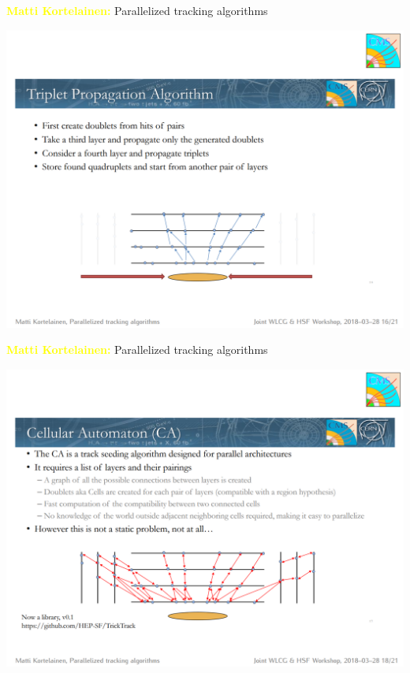 \documentclass[aspectratio=169]{beamer}
\begin{document}
\begin{frame}{\textcolor{yellow}{\bf Matti Kortelainen:} Parallelized tracking algorithms}
\vspace{0.13 cm}
\begin{center}
\includegraphics[width=0.73\linewidth]{tracking-2.png}
\end{center}
\end{frame}

\begin{frame}{\textcolor{yellow}{\bf Matti Kortelainen:} Parallelized tracking algorithms}
\vspace{0.13 cm}
\begin{center}
\includegraphics[width=0.73\linewidth]{tracking-3.png}
\end{center}
\end{frame}
\end{document}
